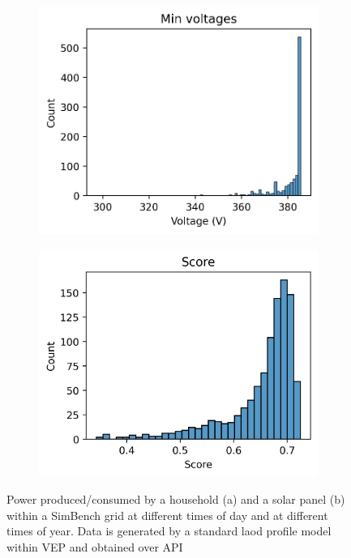 \begin{figure}[H]
\begin{subfigure}{.33\textwidth}
      \caption{}
      \label{fig:result:suburban:histograms:line_loss_rel}
    \end{subfigure}\\
    \begin{subfigure}{.33\textwidth}
      \centering
      \includegraphics[width=\linewidth]{img/switchstate_exploring/swiss_suburb/histograms/min_voltage.png}
      \caption{}
      \label{fig:result:suburban:histograms:min_voltage}
    \end{subfigure}%
    \begin{subfigure}{.33\textwidth}
      \centering
      \includegraphics[width=\linewidth]{img/switchstate_exploring/swiss_suburb/histograms/score.png}
      \caption{}
      \label{fig:result:suburban:histograms:score}
    \end{subfigure}
  \caption{Power produced/consumed by a household (a) and a solar panel (b) within a SimBench grid at different times of day and at different times of year. Data is generated by a standard laod profile model within VEP and obtained over API\autocite{venios}}
  \label{fig:result:suburban:histograms}
\end{figure}

